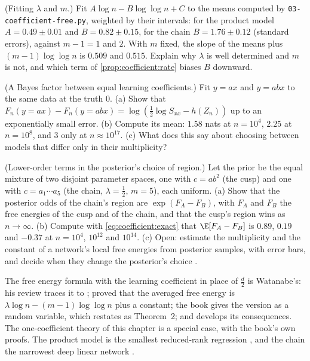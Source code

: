 \begin{refsection}
\begin{exercises}
\item \measurement (Fitting $\lambda$ and $m$.) Fit $A\log n-B\log\log n+C$ to the means computed by \texttt{03-coefficient-free.py}, weighted by their intervals: for the product model $A=0.49\pm0.01$ and $B=0.82\pm0.15$, for the chain $B=1.76\pm0.12$ (standard errors), against $m-1=1$ and $2$. With $m$ fixed, the slope of the means plus $(m-1)\log\log n$ is $0.509$ and $0.515$. Explain why $\lambda$ is well determined and $m$ is not, and which term of \cref{prop:coefficient:rate} biases $B$ downward.\label{ex:coefficient:slopes}

\item \measurement (A Bayes factor between equal learning coefficients.) Fit $y=ax$ and $y=abx$ to the same data at the truth $0$. (a) Show that $F_n(y{=}ax)-F_n(y{=}abx)=\log(\frac12\log S_{xx}-h(Z_n))$ up to an exponentially small error. (b) Compute its mean: $1.58$ nats at $n=10^4$, $2.25$ at $n=10^8$, and $3$ only at $n\approx10^{17}$. (c) What does this say about choosing between models that differ only in their multiplicity?\label{ex:coefficient:bayesfactor}

\item \research (Lower-order terms in the posterior's choice of region.) Let the prior be the equal mixture of two disjoint parameter spaces, one with $c=ab^2$ (the cusp) and one with $c=a_1\cdots a_5$ (the chain, $\lambda=\frac12$, $m=5$), each uniform. (a) Show that the posterior odds of the chain's region are $\exp(F_A-F_B)$, with $F_A$ and $F_B$ the free energies of the cusp and of the chain, and that the cusp's region wins as $n\to\infty$. (b) Compute with \eqref{eq:coefficient:exact} that $\E[F_A-F_B]$ is $0.89$, $0.19$ and $-0.37$ at $n=10^4$, $10^{12}$ and $10^{14}$. (c) Open: estimate the multiplicity and the constant of a network's local free energies from posterior samples, with error bars, and decide when they change the posterior's choice \parencite{CarrollEtAl2025}.\label{ex:coefficient:regions}
\end{exercises}

\notesandrefs
The free energy formula with the learning coefficient in place of $\frac d2$ is Watanabe's: his review \parencite{Watanabe2024} traces it to \textcite{Watanabe1999}; \textcite{Watanabe2001a} proved that the averaged free energy is $\lambda\log n-(m-1)\log\log n$ plus a constant; the book \parencite{Watanabe2009} gives the version as a random variable, which \textcite{Watanabe2013} restates as Theorem~2; and \textcite{Watanabe2018} develops its consequences. The one-coefficient theory of this chapter is a special case, with the book's own proofs. The product model is the smallest reduced-rank regression \parencite{AoyagiWatanabe2005}, and the chain the narrowest deep linear network \parencite{Aoyagi2024}.


\end{refsection}
